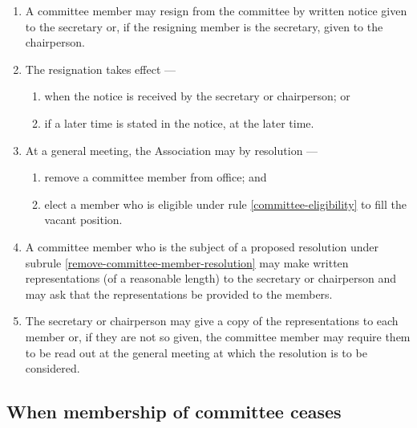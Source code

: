 \documentclass[../constitution.tex]{subfiles}
\begin{document}
\begin{enumerate}

  \item A committee member may resign from the committee by written notice given to the secretary or, if the resigning member is the secretary, given to the chairperson.
  \item The resignation takes effect ---

        \begin{enumerate}

          \item when the notice is received by the secretary or chairperson; or
          \item if a later time is stated in the notice, at the later time.
        \end{enumerate}
  \item At a general meeting, the Association may by resolution ---

        \begin{enumerate}

          \item remove a committee member from office; and \label{remove-committee-member-resolution}
          \item elect a member who is eligible under rule \ref{committee-eligibility} to fill the vacant position. \label{elect-committee-at-general-meeting}
        \end{enumerate}
  \item A committee member who is the subject of a proposed resolution under subrule \ref{remove-committee-member-resolution} may make written representations (of a reasonable length) to the secretary or chairperson and may ask that the representations be provided to the members.
  \item The secretary or chairperson may give a copy of the representations to each member or, if they are not so given, the committee member may require them to be read out at the general meeting at which the resolution is to be considered.
\end{enumerate}

\hypertarget{when-membership-of-committee-ceases}{%
  \subsection{When membership of committee ceases}\label{when-membership-of-committee-ceases}}
\end{document}
